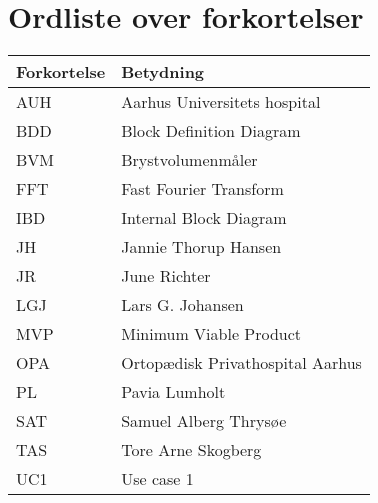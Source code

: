\section*{Ordliste over forkortelser}

\vspace{1cm}
\begin{table}[hbt]
\centering
\label{ordliste}
\begin{tabular}{|l|l|}
\hline
\textbf{Forkortelse             } & \textbf{Betydning             } \\ \hline
AUH & Aarhus Universitets hospital \\ \hline
BDD & Block Definition Diagram \\ \hline
BVM & Brystvolumenmåler \\ \hline
FFT & Fast Fourier Transform \\ \hline
IBD & Internal Block Diagram \\ \hline 
JH & Jannie Thorup Hansen \\ \hline
JR & June Richter  \\ \hline
LGJ & Lars G. Johansen \\ \hline 
MVP & Minimum Viable Product \\ \hline
OPA & Ortopædisk Privathospital Aarhus\\ \hline
PL & Pavia Lumholt \\ \hline
SAT & Samuel Alberg Thrysøe \\ \hline
TAS & Tore Arne Skogberg \\ \hline
UC1 & Use case 1 \\ \hline
\end{tabular}
\end{table}